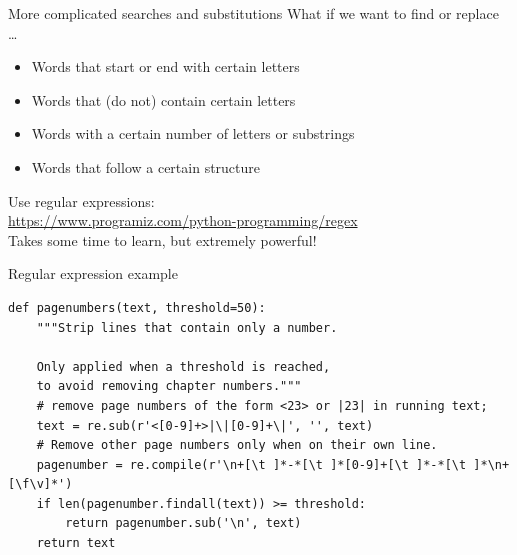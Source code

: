 \documentclass[aspectratio=169,usenames,dvipsnames]{beamer}
\begin{document}
\begin{frame}{More complicated searches and substitutions}
What if we want to find or replace \dots
\begin{itemize}
    \item Words that start or end with certain letters
    \item Words that (do not) contain certain letters
    \item Words with a certain number of letters or substrings
    \item Words that follow a certain structure
\end{itemize}

Use regular expressions:\\
\url{https://www.programiz.com/python-programming/regex} \\

\vspace{1em}
Takes some time to learn, but extremely powerful!
\end{frame}
\begin{frame}[fragile]{Regular expression example}
\begin{lstlisting}
def pagenumbers(text, threshold=50):
    """Strip lines that contain only a number.

    Only applied when a threshold is reached,
    to avoid removing chapter numbers."""
    # remove page numbers of the form <23> or |23| in running text;
    text = re.sub(r'<[0-9]+>|\|[0-9]+\|', '', text)
    # Remove other page numbers only when on their own line.
    pagenumber = re.compile(r'\n+[\t ]*-*[\t ]*[0-9]+[\t ]*-*[\t ]*\n+[\f\v]*')
    if len(pagenumber.findall(text)) >= threshold:
        return pagenumber.sub('\n', text)
    return text
\end{lstlisting}
\end{frame}
\end{document}
